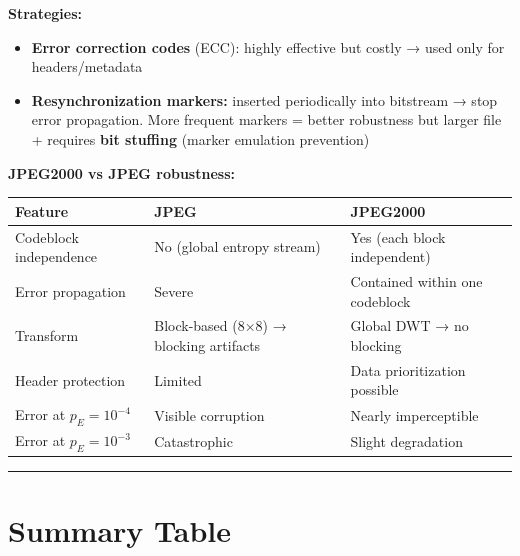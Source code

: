 \textbf{Strategies:}
\begin{itemize}
\item \textbf{Error correction codes} (ECC): highly effective but costly → used only for headers/metadata
\item \textbf{Resynchronization markers:} inserted periodically into bitstream → stop error propagation. More frequent markers = better robustness but larger file + requires \textbf{bit stuffing} (marker emulation prevention)
\end{itemize}

\textbf{JPEG2000 vs JPEG robustness:}

\begin{center}
\begin{tabular}{|l|l|l|}
\hline
\textbf{Feature} & \textbf{JPEG} & \textbf{JPEG2000} \\ \hline
Codeblock independence & No (global entropy stream) & Yes (each block independent) \\ \hline
Error propagation & Severe & Contained within one codeblock \\ \hline
Transform & Block-based (8×8) → blocking artifacts & Global DWT → no blocking \\ \hline
Header protection & Limited & Data prioritization possible \\ \hline
Error at $p_E = 10^{-4}$ & Visible corruption & Nearly imperceptible \\ \hline
Error at $p_E = 10^{-3}$ & Catastrophic & Slight degradation \\ \hline
\end{tabular}
\end{center}

\begin{center}\end{center}

\begin{center}\end{center}

\bigskip\hrule\bigskip

\section{Summary Table}

